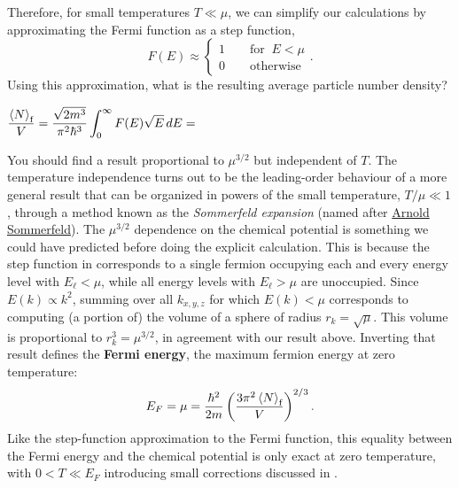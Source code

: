 Therefore, for small temperatures $T \ll \mu$, we can simplify our calculations by approximating the Fermi function as a step function,
\begin{equation}
  \label{eq:Fermi_step}
  F(E) \approx \left\{\begin{array}{l}1 \qquad \mbox{for } \ E < \mu \\
                                      0 \qquad \mbox{otherwise}\end{array}\right. .
\end{equation}
Using this approximation, what is the resulting average particle number density?
\begin{mdframed}
  $\displaystyle \frac{\left\langle N \right\rangle_{\text{f}}}{V} = \frac{\sqrt{2m^3}}{\pi^2 \hbar^3} \int_0^{\infty} F(E) \sqrt{E} \mathop{dE} = $ \\[100 pt]
\end{mdframed}

You should find a result proportional to $\mu^{3 / 2}$ but independent of $T$.
The temperature independence turns out to be the leading-order behaviour of a more general result that can be organized in powers of the small temperature, $T / \mu \ll 1$, through a method known as the \textit{Sommerfeld expansion} (named after \href{https://en.wikipedia.org/wiki/Arnold_Sommerfeld}{Arnold Sommerfeld}).
The $\mu^{3 / 2}$ dependence on the chemical potential is something we could have predicted before doing the explicit calculation.
This is because the step function in  corresponds to a single fermion occupying each and every energy level with $E_{\ell} < \mu$, while all energy levels with $E_{\ell} > \mu$ are unoccupied.
Since $E(k) \propto k^2$, summing over all $k_{x, y, z}$ for which $E(k) < \mu$ corresponds to computing (a portion of) the volume of a sphere of radius $r_k = \sqrt{\mu}$.
This volume is proportional to $r_k^3 = \mu^{3 / 2}$, in agreement with our result above.
Inverting that result defines the \textbf{Fermi energy}, the maximum fermion energy at zero temperature:
\begin{equation}
  \label{eq:Fermi_energy}
  E_F = \mu = \frac{\hbar^2}{2m}\left(\frac{3\pi^2 \left\langle N \right\rangle_{\text{f}}}{V}\right)^{2 / 3}.
\end{equation}
Like the step-function approximation to the Fermi function, this equality between the Fermi energy and the chemical potential is only exact at zero temperature, with $0 < T \ll E_F$ introducing small corrections discussed in . %

